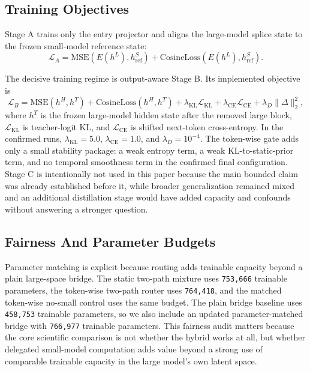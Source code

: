 \documentclass[11pt]{article}
\begin{document}
\subsection{Training Objectives}

Stage A trains only the entry projector and aligns the large-model splice state to the frozen small-model reference state:
\begin{equation}
\mathcal{L}_A = \mathrm{MSE}(E(h^L), h^S_{\mathrm{ref}}) + \mathrm{CosineLoss}(E(h^L), h^S_{\mathrm{ref}}).
\end{equation}

The decisive training regime is output-aware Stage B. Its implemented objective is
\begin{equation}
\mathcal{L}_B = \mathrm{MSE}(h^H, h^T) + \mathrm{CosineLoss}(h^H, h^T) + \lambda_{\mathrm{KL}}\mathcal{L}_{\mathrm{KL}} + \lambda_{\mathrm{CE}}\mathcal{L}_{\mathrm{CE}} + \lambda_D \lVert \Delta \rVert_2^2,
\end{equation}
where $h^T$ is the frozen large-model hidden state after the removed large block, $\mathcal{L}_{\mathrm{KL}}$ is teacher-logit KL, and $\mathcal{L}_{\mathrm{CE}}$ is shifted next-token cross-entropy. In the confirmed runs, $\lambda_{\mathrm{KL}} = 5.0$, $\lambda_{\mathrm{CE}} = 1.0$, and $\lambda_D = 10^{-4}$. The token-wise gate adds only a small stability package: a weak entropy term, a weak KL-to-static-prior term, and no temporal smoothness term in the confirmed final configuration. Stage C is intentionally not used in this paper because the main bounded claim was already established before it, while broader generalization remained mixed and an additional distillation stage would have added capacity and confounds without answering a stronger question.

\subsection{Fairness And Parameter Budgets}

Parameter matching is explicit because routing adds trainable capacity beyond a plain large-space bridge. The static two-path mixture uses \texttt{753,666} trainable parameters, the token-wise two-path router uses \texttt{764,418}, and the matched token-wise no-small control uses the same budget. The plain bridge baseline uses \texttt{458,753} trainable parameters, so we also include an updated parameter-matched bridge with \texttt{766,977} trainable parameters. This fairness audit matters because the core scientific comparison is not whether the hybrid works at all, but whether delegated small-model computation adds value beyond a strong use of comparable trainable capacity in the large model's own latent space.
\end{document}
